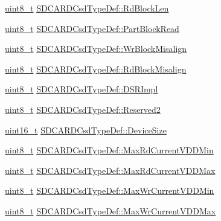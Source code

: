 \begin{DoxyCompactItemize}
\hyperlink{stdint_8h_aba7bc1797add20fe3efdf37ced1182c5}{uint8\-\_\-t} \hyperlink{group___p_i_o_s___s_d_c_a_r_d_gab4a98c4b27e0e4cbb4ace4d6ff93c056}{S\-D\-C\-A\-R\-D\-Csd\-Type\-Def\-::\-Rd\-Block\-Len}
\item 
\hyperlink{stdint_8h_aba7bc1797add20fe3efdf37ced1182c5}{uint8\-\_\-t} \hyperlink{group___p_i_o_s___s_d_c_a_r_d_gab165bf6b064166e0bf54f2a6c7d85a9a}{S\-D\-C\-A\-R\-D\-Csd\-Type\-Def\-::\-Part\-Block\-Read}
\item 
\hyperlink{stdint_8h_aba7bc1797add20fe3efdf37ced1182c5}{uint8\-\_\-t} \hyperlink{group___p_i_o_s___s_d_c_a_r_d_gac79fcdd1037496c353ac1570fb9a58a5}{S\-D\-C\-A\-R\-D\-Csd\-Type\-Def\-::\-Wr\-Block\-Misalign}
\item 
\hyperlink{stdint_8h_aba7bc1797add20fe3efdf37ced1182c5}{uint8\-\_\-t} \hyperlink{group___p_i_o_s___s_d_c_a_r_d_ga959156fe53645cd48d715f89c3407618}{S\-D\-C\-A\-R\-D\-Csd\-Type\-Def\-::\-Rd\-Block\-Misalign}
\item 
\hyperlink{stdint_8h_aba7bc1797add20fe3efdf37ced1182c5}{uint8\-\_\-t} \hyperlink{group___p_i_o_s___s_d_c_a_r_d_ga650841d99b60792a21a853a6a2c541d9}{S\-D\-C\-A\-R\-D\-Csd\-Type\-Def\-::\-D\-S\-R\-Impl}
\item 
\hyperlink{stdint_8h_aba7bc1797add20fe3efdf37ced1182c5}{uint8\-\_\-t} \hyperlink{group___p_i_o_s___s_d_c_a_r_d_ga2580f84971aaa12e06b546fd8b884dad}{S\-D\-C\-A\-R\-D\-Csd\-Type\-Def\-::\-Reserved2}
\item 
\hyperlink{stdint_8h_a273cf69d639a59973b6019625df33e30}{uint16\-\_\-t} \hyperlink{group___p_i_o_s___s_d_c_a_r_d_ga32e9f1203e96670adc0e71599231da0f}{S\-D\-C\-A\-R\-D\-Csd\-Type\-Def\-::\-Device\-Size}
\item 
\hyperlink{stdint_8h_aba7bc1797add20fe3efdf37ced1182c5}{uint8\-\_\-t} \hyperlink{group___p_i_o_s___s_d_c_a_r_d_ga44848558ce422fd005494fcb94656fa8}{S\-D\-C\-A\-R\-D\-Csd\-Type\-Def\-::\-Max\-Rd\-Current\-V\-D\-D\-Min}
\item 
\hyperlink{stdint_8h_aba7bc1797add20fe3efdf37ced1182c5}{uint8\-\_\-t} \hyperlink{group___p_i_o_s___s_d_c_a_r_d_ga3ba17f2a67a38414d67aaad8d7cc99be}{S\-D\-C\-A\-R\-D\-Csd\-Type\-Def\-::\-Max\-Rd\-Current\-V\-D\-D\-Max}
\item 
\hyperlink{stdint_8h_aba7bc1797add20fe3efdf37ced1182c5}{uint8\-\_\-t} \hyperlink{group___p_i_o_s___s_d_c_a_r_d_ga592f9aec07e72eed97e1f28155f23ab4}{S\-D\-C\-A\-R\-D\-Csd\-Type\-Def\-::\-Max\-Wr\-Current\-V\-D\-D\-Min}
\item 
\hyperlink{stdint_8h_aba7bc1797add20fe3efdf37ced1182c5}{uint8\-\_\-t} \hyperlink{group___p_i_o_s___s_d_c_a_r_d_gab98289ea1b8bc4b5e7fee1820487c07c}{S\-D\-C\-A\-R\-D\-Csd\-Type\-Def\-::\-Max\-Wr\-Current\-V\-D\-D\-Max}

\end{DoxyCompactItemize}
